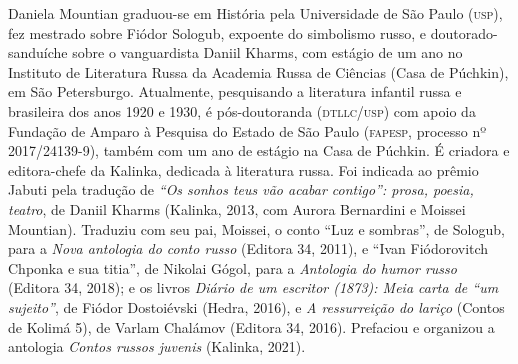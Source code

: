 \documentclass[11pt]{extarticle}
\begin{document}

Daniela Mountian graduou-se em História pela Universidade de São Paulo (\textsc{usp}), fez mestrado sobre Fiódor Sologub, expoente do simbolismo russo, e doutorado-sanduíche sobre o vanguardista Daniil Kharms, com estágio de um ano no Instituto de Literatura Russa da Academia Russa de Ciências (Casa de Púchkin), em São Petersburgo. Atualmente, pesquisando a literatura infantil russa e brasileira dos anos 1920 e 1930, é pós-doutoranda (\textsc{dtllc/usp}) com apoio da Fundação de Amparo à Pesquisa do Estado de São Paulo (\textsc{fapesp}, processo nº 2017/24139-9), também com um ano de estágio na Casa de Púchkin. É criadora e editora-chefe da Kalinka, dedicada à literatura russa. Foi indicada ao prêmio Jabuti pela tradução de \textit{“Os sonhos teus vão acabar contigo”: prosa, poesia, teatro}, de Daniil Kharms (Kalinka, 2013, com Aurora Bernardini e Moissei Mountian). Traduziu com seu pai, Moissei, o conto “Luz e sombras”, de Sologub, para a \textit{Nova antologia do conto russo} (Editora 34, 2011), e “Ivan Fiódorovitch Chponka e sua titia”, de Nikolai Gógol, para a \textit{Antologia do humor russo} (Editora 34, 2018); e os livros \textit{Diário de um escritor (1873): Meia carta de “um sujeito”}, de Fiódor Dostoiévski (Hedra, 2016), e \textit{A ressurreição do lariço} (Contos de Kolimá 5), de Varlam Chalámov (Editora 34, 2016). Prefaciou e organizou a antologia \textit{Contos russos juvenis} (Kalinka, 2021).
 
\end{document}
